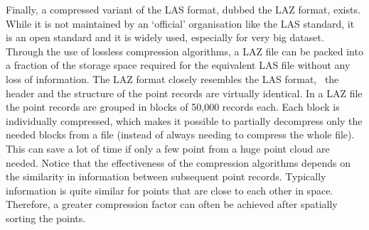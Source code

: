 
Finally, a compressed variant of the LAS format, dubbed the LAZ format, exists.
While it is not maintained by an `official' organisation like the LAS standard, it is an open standard and it is widely used, especially for very big dataset.
Through the use of lossless compression algorithms, a LAZ file can be packed into a fraction of the storage space required for the equivalent LAS file without any loss of information.
The LAZ format closely resembles the LAS format, \ie\ the header and the structure of the point records are virtually identical.
In a LAZ file the point records are grouped in blocks of 50,000 records each.
Each block is individually compressed, which makes it possible to partially decompress only the needed blocks from a file (instead of always needing to compress the whole file).
This can save a lot of time if only a few point from a huge point cloud are needed.
Notice that the effectiveness of the compression algorithms depends on the similarity in information between subsequent point records.
Typically information is quite similar for points that are close to each other in space.
Therefore, a greater compression factor can often be achieved after spatially sorting the points.

